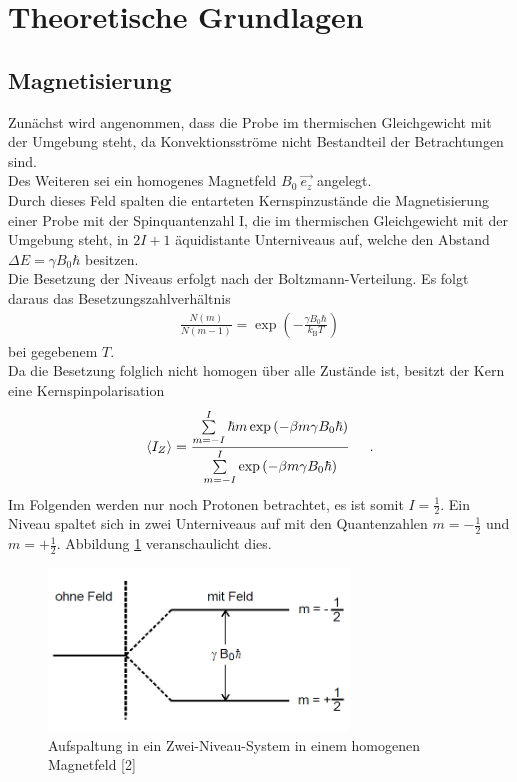 \documentclass[]{scrartcl}
\begin{document}
\section{Theoretische Grundlagen}
\subsection{Magnetisierung}
Zunächst wird angenommen, dass die Probe im thermischen Gleichgewicht mit der Umgebung steht, da Konvektionsströme nicht Bestandteil der Betrachtungen sind.\\
Des Weiteren sei ein homogenes Magnetfeld $B_0\ \vec{e_z}$ angelegt.\\
Durch dieses Feld spalten die entarteten Kernspinzustände die Magnetisierung einer Probe mit der Spinquantenzahl I, die im thermischen Gleichgewicht mit der Umgebung steht, in $2I+1$ äquidistante Unterniveaus auf, welche den Abstand $\Delta E = \gamma B_0 \hbar$ besitzen.\\
Die Besetzung der Niveaus erfolgt nach der Boltzmann-Verteilung. Es folgt daraus das Besetzungszahlverhältnis 
\begin{align}
\frac{N\left(m\right)}{N\left(m-1\right)}=\exp \left(-\frac{\gamma B_0\hbar}{k_\text{B}T}\right)
\end{align}
bei gegebenem $T$.\\
Da die Besetzung folglich nicht homogen über alle Zustände ist, besitzt der Kern eine Kernspinpolarisation
\begin{align}
\left\langle I_Z \right\rangle = \frac{\sum\limits_{m=-I}^{I} \hbar m \exp\left(-\beta m\gamma B_0 \hbar \right)}{\sum\limits_{m=-I}^{I} \exp\left(-\beta m\gamma B_0 \hbar \right)} \label{eq_izallgemein}\hspace*{0.5cm}\text{.}
\end{align}
Im Folgenden werden nur noch Protonen betrachtet, es ist somit $I=\frac{1}{2}$. Ein Niveau spaltet sich in zwei Unterniveaus auf mit den Quantenzahlen $m=-\frac{1}{2}$ und $m=+\frac{1}{2}$. Abbildung \ref{fig_aufspaltung} veranschaulicht dies.
\begin{figure}[H]
\centering
\includegraphics[width=8cm]{images/aufspaltung_magnetfeld.png}
\caption{Aufspaltung in ein Zwei-Niveau-System in einem homogenen Magnetfeld [2]}
\label{fig_aufspaltung}
\end{figure}
\end{document}
